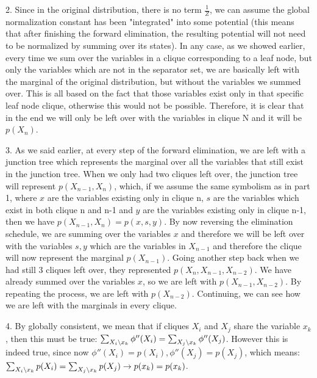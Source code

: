 \documentclass[11pt,a4paper,oneside]{report}
\newcommand\SLASH{\char`\\}
\begin{document}
	2. Since in the original distribution, there is no term $\frac{1}{Z}$, we can assume the global normalization constant has been "integrated" into some potential (this means that after finishing the forward elimination, the resulting potential will not need to be normalized by summing over its states). In any case, as we showed earlier, every time we sum over the variables in a clique corresponding to a leaf node, but only the variables which are not in the separator set, we are basically left with the marginal of the original distribution, but without the variables we summed over. This is all based on the fact that those variables exist only in that specific leaf node clique, otherwise this would not be possible. Therefore, it is clear that in the end we will only be left over with the variables in clique N and it will be $p(X_n)$.
	
	3. As we said earlier, at every step of the forward elimination, we are left with a junction tree which represents the marginal over all the variables that still exist in the junction tree. When we only had two cliques left over, the junction tree will represent $p(X_{n-1},X_n)$, which, if we assume the same symbolism as in part 1, where $x$ are the variables existing only in clique n, $s$ are the variables which exist in both clique n and n-1 and $y$ are the variables existing only in clique n-1, then we have $p(X_{n-1},X_n)=p(x,s,y)$. By now reversing the elimination schedule, we are summing over the variables $x$ and therefore we will be left over with the variables $s,y$ which are the variables in $X_{n-1}$ and therefore the clique will now represent the marginal $p(X_{n-1})$. Going another step back when we had still 3 cliques left over, they represented $p(X_n,X_{n-1},X_{n-2})$. We have already summed over the variables $x$, so we are left with $p(X_{n-1},X_{n-2})$. By repeating the process, we are left with $p(X_{n-2})$. Continuing, we can see how we are left with the marginals in every clique.
	
	4. By globally consistent, we mean that if cliques $X_i$ and $X_j$ share the variable $x_k$, then this must be true: $\sum_{X_i \SLASH x_k} \phi''(X_i) = \sum_{X_j \SLASH x_k} \phi''(X_j)$. However this is indeed true, since now $\phi''(X_i)=p(X_i),\phi''(X_j)=p(X_j)$, which means: $\sum_{X_i \SLASH x_k} p(X_i) = \sum_{X_j \SLASH x_k} p(X_j) \rightarrow p(x_k)=p(x_k)$. 
\end{document}
